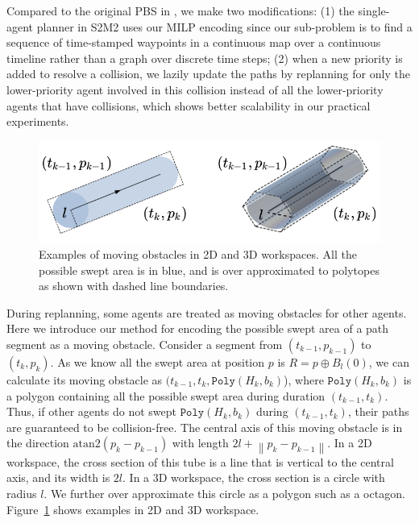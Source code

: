 \documentclass[letterpaper]{article} %
\theoremstyle{definition}
\newcommand{\norm}[1]{\left\lVert#1\right\rVert}
\begin{document}
Compared to the original PBS in \cite{ma2019searching}, we make two modifications: (1) the single-agent planner in S2M2 uses our MILP encoding since our sub-problem is to find a sequence of time-stamped waypoints in a continuous map over a continuous timeline rather than a graph over discrete time steps; (2) when a new priority is added to resolve a collision, we lazily update the paths by replanning for only the lower-priority agent involved in this collision instead of all the lower-priority agents that have collisions, which shows better scalability in our practical experiments.


\begin{figure}[t]
\centering
\includegraphics[width=0.8\columnwidth]{moving.png}
\caption{Examples of moving obstacles in 2D and 3D workspaces. All the possible swept area is in blue, and is over approximated to polytopes as shown with dashed line boundaries.}
\label{fig:moving}
\end{figure}

During replanning, some agents are treated as moving obstacles for other agents. Here we introduce our method for encoding the possible swept area of a path segment as a moving obstacle. Consider a segment from $(t_{k-1}, p_{k-1})$ to $(t_k, p_k)$. As we know all the swept area at position $p$ is $R = p \oplus B_{l}(0)$, we can calculate its moving obstacle as $(t_{k-1}, t_k, \texttt{Poly}(H_k, b_k)$), where $\texttt{Poly}(H_k, b_k)$ is a polygon containing all the possible swept area during duration $(t_{k-1}, t_k)$. Thus, if other agents do not swept $\texttt{Poly}(H_k, b_k)$ during $(t_{k-1}, t_k)$, their paths are guaranteed to be collision-free. The central axis of this moving obstacle is in the direction $\mbox{atan2}(p_{k} - p_{k-1})$ with length $2l + \norm{p_k - p_{k-1}}$. In a 2D workspace, the cross section of this tube is a line that is vertical to the central axis, and its width is $2l$. In a 3D workspace, the cross section is a circle with radius $l$. We further over approximate this circle as a polygon such as a octagon. Figure~\ref{fig:moving} shows examples in 2D and 3D workspace. 
\end{document}
